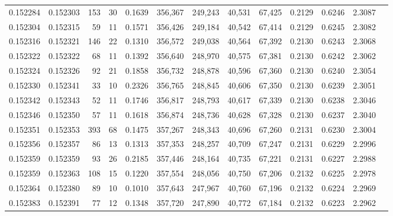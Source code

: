 \begin{tabular}{rrrrrrrrrrrrr}
0.152284 & 0.152303 &   153 &  30 &                                     0.1639 & 356,367 & 249,243 &  40,531 &  67,425 & 0.2129 & 0.6246 & 2.3087 \\
0.152304 & 0.152315 &    59 &  11 &                                     0.1571 & 356,426 & 249,184 &  40,542 &  67,414 & 0.2129 & 0.6245 & 2.3082 \\
0.152316 & 0.152321 &   146 &  22 &                                     0.1310 & 356,572 & 249,038 &  40,564 &  67,392 & 0.2130 & 0.6243 & 2.3068 \\
0.152322 & 0.152322 &    68 &  11 &                                     0.1392 & 356,640 & 248,970 &  40,575 &  67,381 & 0.2130 & 0.6242 & 2.3062 \\
0.152324 & 0.152326 &    92 &  21 &                                     0.1858 & 356,732 & 248,878 &  40,596 &  67,360 & 0.2130 & 0.6240 & 2.3054 \\
0.152330 & 0.152341 &    33 &  10 &                                     0.2326 & 356,765 & 248,845 &  40,606 &  67,350 & 0.2130 & 0.6239 & 2.3051 \\
0.152342 & 0.152343 &    52 &  11 &                                     0.1746 & 356,817 & 248,793 &  40,617 &  67,339 & 0.2130 & 0.6238 & 2.3046 \\
0.152346 & 0.152350 &    57 &  11 &                                     0.1618 & 356,874 & 248,736 &  40,628 &  67,328 & 0.2130 & 0.6237 & 2.3040 \\
0.152351 & 0.152353 &   393 &  68 &                                     0.1475 & 357,267 & 248,343 &  40,696 &  67,260 & 0.2131 & 0.6230 & 2.3004 \\
0.152356 & 0.152357 &    86 &  13 &                                     0.1313 & 357,353 & 248,257 &  40,709 &  67,247 & 0.2131 & 0.6229 & 2.2996 \\
0.152359 & 0.152359 &    93 &  26 &                                     0.2185 & 357,446 & 248,164 &  40,735 &  67,221 & 0.2131 & 0.6227 & 2.2988 \\
0.152359 & 0.152363 &   108 &  15 &                                     0.1220 & 357,554 & 248,056 &  40,750 &  67,206 & 0.2132 & 0.6225 & 2.2978 \\
0.152364 & 0.152380 &    89 &  10 &                                     0.1010 & 357,643 & 247,967 &  40,760 &  67,196 & 0.2132 & 0.6224 & 2.2969 \\
0.152383 & 0.152391 &    77 &  12 &                                     0.1348 & 357,720 & 247,890 &  40,772 &  67,184 & 0.2132 & 0.6223 & 2.2962 \\

\end{tabular}
